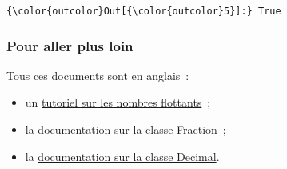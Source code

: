 \begin{Verbatim}[commandchars=\\\{\}]
{\color{outcolor}Out[{\color{outcolor}5}]:} True
\end{Verbatim}
            
    \hypertarget{pour-aller-plus-loin}{%
\subsubsection{Pour aller plus loin}\label{pour-aller-plus-loin}}

    Tous ces documents sont en anglais~:

\begin{itemize}
\tightlist
\item
  un
  \href{https://docs.python.org/3/tutorial/floatingpoint.html}{tutoriel
  sur les nombres flottants}~;
\item
  la
  \href{https://docs.python.org/3/library/fractions.html}{documentation
  sur la classe Fraction}~;
\item
  la \href{https://docs.python.org/3/library/decimal.html}{documentation
  sur la classe Decimal}.
\end{itemize}


    
    
    
